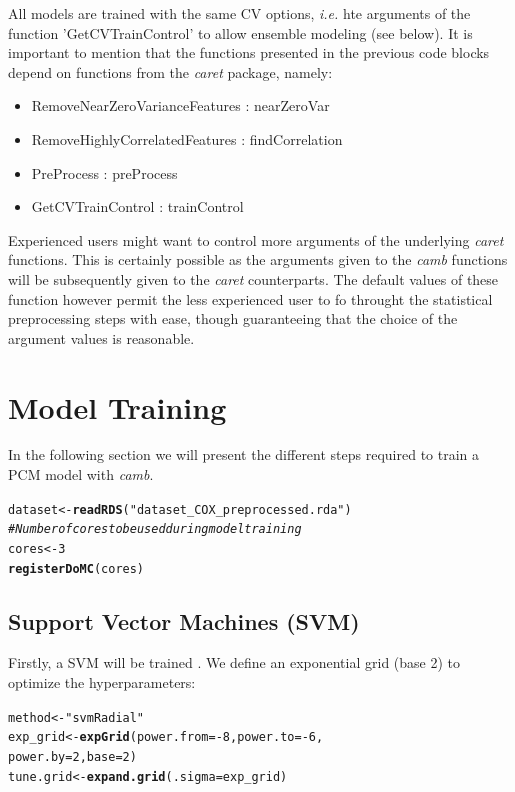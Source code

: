 \documentclass[twoside,a4wide,12pt]{article}\usepackage[]{graphicx}\usepackage[]{color}
\makeatletter
\newcommand{\hlnum}[1]{\textcolor[rgb]{0.686,0.059,0.569}{#1}}%
\newcommand{\hlstr}[1]{\textcolor[rgb]{0.192,0.494,0.8}{#1}}%
\newcommand{\hlcom}[1]{\textcolor[rgb]{0.678,0.584,0.686}{\textit{#1}}}%
\newcommand{\hlopt}[1]{\textcolor[rgb]{0,0,0}{#1}}%
\newcommand{\hlstd}[1]{\textcolor[rgb]{0.345,0.345,0.345}{#1}}%
\newcommand{\hlkwb}[1]{\textcolor[rgb]{0.69,0.353,0.396}{#1}}%
\newcommand{\hlkwc}[1]{\textcolor[rgb]{0.333,0.667,0.333}{#1}}%
\newcommand{\hlkwd}[1]{\textcolor[rgb]{0.737,0.353,0.396}{\textbf{#1}}}%
\newenvironment{kframe}{%
 \def\at@end@of@kframe{}%
 \ifinner\ifhmode%
  \def\at@end@of@kframe{\end{minipage}}%
  \begin{minipage}{\columnwidth}%
 \fi\fi%
 \def\FrameCommand##1{\hskip\@totalleftmargin \hskip-\fboxsep
 \colorbox{shadecolor}{##1}\hskip-\fboxsep
     \hskip-\linewidth \hskip-\@totalleftmargin \hskip\columnwidth}%
 \MakeFramed {\advance\hsize-\width
   \@totalleftmargin\z@ \linewidth\hsize
   \@setminipage}}%
 {\par\unskip\endMakeFramed%
 \at@end@of@kframe}
\newenvironment{knitrout}{}{} %
\makeatother
\begin{document}
All models are trained with the same CV options, {\it i.e.} hte arguments of the function 'GetCVTrainControl' to allow ensemble modeling (see below).
It is important to mention that the functions presented in the previous code blocks depend on functions from the {\it caret} package, namely: 
\begin{itemize}
\item RemoveNearZeroVarianceFeatures : nearZeroVar
\item RemoveHighlyCorrelatedFeatures : findCorrelation
\item PreProcess : preProcess
\item GetCVTrainControl : trainControl
\end{itemize}
Experienced users might want to control more arguments of the underlying {\it caret} functions.
This is certainly possible as the arguments given to the {\it camb} functions will be subsequently given to the {\it caret} counterparts.
The default values of these function however permit the less experienced user to fo throught the statistical preprocessing
steps with ease, though guaranteeing that the choice of the argument values is reasonable.


\section{Model Training}
In the following section we will present the different steps required to train a PCM model with {\it camb}.
\begin{knitrout}
\color{fgcolor}\begin{kframe}
\begin{alltt}
\hlstd{dataset} \hlkwb{<-} \hlkwd{readRDS}\hlstd{(}\hlstr{"dataset_COX_preprocessed.rda"}\hlstd{)}
\hlcom{# Number of cores to be used during model training}
\hlstd{cores} \hlkwb{<-} \hlnum{3}
\hlkwd{registerDoMC}\hlstd{(cores)}
\end{alltt}
\end{kframe}
\end{knitrout}


\subsection{Support Vector Machines (SVM)}
Firstly, a SVM will be trained \cite{svmreview}.
We define an exponential grid (base 2) to optimize the hyperparameters:

\begin{knitrout}
\color{fgcolor}\begin{kframe}
\begin{alltt}
\hlstd{method} \hlkwb{<-} \hlstr{"svmRadial"}
\hlstd{exp_grid} \hlkwb{<-} \hlkwd{expGrid}\hlstd{(}\hlkwc{power.from} \hlstd{=} \hlopt{-}\hlnum{8}\hlstd{,} \hlkwc{power.to} \hlstd{=} \hlopt{-}\hlnum{6}\hlstd{,}
    \hlkwc{power.by} \hlstd{=} \hlnum{2}\hlstd{,} \hlkwc{base} \hlstd{=} \hlnum{2}\hlstd{)}
\hlstd{tune.grid} \hlkwb{<-} \hlkwd{expand.grid}\hlstd{(}\hlkwc{.sigma} \hlstd{= exp_grid)}
\end{alltt}
\end{kframe}
\end{knitrout}
\end{document}
